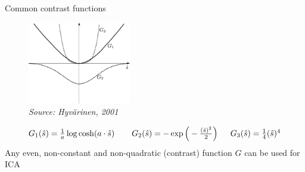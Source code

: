\newpage
\begin{frame}{Common contrast functions}
 
 \begin{figure}
 	\centering
 	\includegraphics[width=4.5cm]{./img/contrast_functions.pdf}
    \vspace{-0.5cm}
 	\caption*{\hspace{5cm}\textit{\tiny{Source: Hyv\"arinen, 2001}}}
 \end{figure}
 
 \begin{equation*}
 	\smaller
 \begin{array}{lll}
 	G_1(\hat{s}) = \frac{1}{a} \log \cosh (a \cdot \hat{s}) 
 	\;\;& \;\;G_2(\hat{s}) = -\exp \Big( -\frac{(\hat{s})^2}{2} \Big)
 	& \;\;G_3(\hat{s}) = \frac{1}{4} (\hat{s})^4
	\end{array}
 \end{equation*}
 Any even, non-constant and non-quadratic (contrast) function $G$ can be used for ICA
 
 
 \end{frame}

